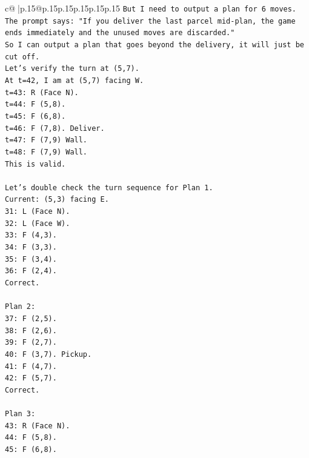 \documentclass{article}
\begin{document}
{\begin{supertabular}{c@{$\;$}|p{.15\linewidth}@{}p{.15\linewidth}p{.15\linewidth}p{.15\linewidth}p{.15\linewidth}p{.15\linewidth}}
{{{\texttt{But I need to output a plan for 6 moves.} \\
\texttt{The prompt says: "If you deliver the last parcel mid{-}plan, the game ends immediately and the unused moves are discarded."} \\
\texttt{So I can output a plan that goes beyond the delivery, it will just be cut off.} \\
\texttt{Let's verify the turn at (5,7).} \\
\texttt{At t=42, I am at (5,7) facing W.} \\
\texttt{t=43: R (Face N).} \\
\texttt{t=44: F (5,8).} \\
\texttt{t=45: F (6,8).} \\
\texttt{t=46: F (7,8). Deliver.} \\
\texttt{t=47: F (7,9) Wall.} \\
\texttt{t=48: F (7,9) Wall.} \\
\texttt{This is valid.} \\
\\ 
\texttt{Let's double check the turn sequence for Plan 1.} \\
\texttt{Current: (5,3) facing E.} \\
\texttt{31: L (Face N).} \\
\texttt{32: L (Face W).} \\
\texttt{33: F (4,3).} \\
\texttt{34: F (3,3).} \\
\texttt{35: F (3,4).} \\
\texttt{36: F (2,4).} \\
\texttt{Correct.} \\
\\ 
\texttt{Plan 2:} \\
\texttt{37: F (2,5).} \\
\texttt{38: F (2,6).} \\
\texttt{39: F (2,7).} \\
\texttt{40: F (3,7). Pickup.} \\
\texttt{41: F (4,7).} \\
\texttt{42: F (5,7).} \\
\texttt{Correct.} \\
\\ 
\texttt{Plan 3:} \\
\texttt{43: R (Face N).} \\
\texttt{44: F (5,8).} \\
\texttt{45: F (6,8).} \\
}}}
\end{supertabular}}
\end{document}

